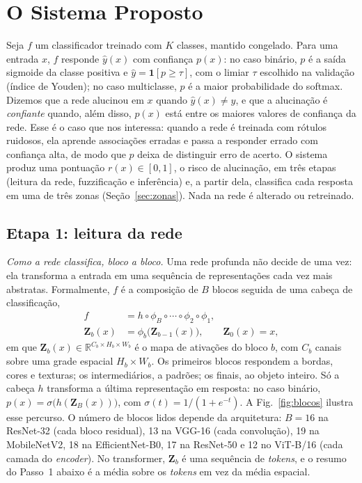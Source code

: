 \section{O Sistema Proposto}

Seja $f$ um classificador treinado com $K$ classes, mantido congelado. Para uma entrada $x$, $f$ responde $\hat y(x)$ com confiança $p(x)$:
no caso binário, $p$ é a saída sigmoide da classe positiva e $\hat y = \mathbf{1}[p \ge \tau]$, com o limiar $\tau$ escolhido na validação
(índice de Youden); no caso multiclasse, $p$ é a maior probabilidade do softmax. Dizemos que a rede alucinou em $x$ quando $\hat y(x) \ne y$, e que a alucinação é \emph{confiante} quando, além disso, $p(x)$ está entre os
maiores valores de confiança da rede. Esse é o caso que nos interessa: quando a rede é treinada com rótulos ruidosos, ela aprende
associações erradas e passa a responder errado com confiança alta, de modo que $p$ deixa de distinguir erro de acerto.
O sistema produz uma pontuação $r(x) \in [0,1]$, o risco de alucinação, em três etapas (leitura da rede, fuzzificação e inferência)
e, a partir dela, classifica cada resposta em uma de três zonas (Seção~\ref{sec:zonas}). Nada na rede é alterado ou retreinado.

\subsection{Etapa 1: leitura da rede}
\label{sec:leitura}

\textit{Como a rede classifica, bloco a bloco.}
Uma rede profunda não decide de uma vez: ela transforma a entrada em uma sequência de representações cada vez mais abstratas. Formalmente,
$f$ é a composição de $B$ blocos seguida de uma cabeça de classificação,
\begin{align}
  f &= h \circ \phi_B \circ \cdots \circ \phi_2 \circ \phi_1, \nonumber\\
  \mathbf{Z}_b(x) &= \phi_b\big(\mathbf{Z}_{b-1}(x)\big), \qquad \mathbf{Z}_0(x) = x,
  \label{eq:blocos}
\end{align}
em que $\mathbf{Z}_b(x) \in \mathbb{R}^{C_b \times H_b \times W_b}$ é o mapa de ativações do bloco $b$, com $C_b$ canais sobre uma grade
espacial $H_b \times W_b$. Os primeiros blocos respondem a bordas, cores e texturas; os intermediários, a padrões; os finais, ao objeto
inteiro. Só a cabeça $h$ transforma a última representação em resposta: no caso binário, $p(x) = \sigma\big(h(\mathbf{Z}_B(x))\big)$, com
$\sigma(t) = 1/(1+e^{-t})$. A Fig.~\ref{fig:blocos} ilustra esse percurso. O número de blocos lidos depende da arquitetura: $B=16$ na ResNet-32 (cada bloco
residual), 13 na VGG-16 (cada convolução), 19 na MobileNetV2, 18 na EfficientNet-B0, 17 na ResNet-50 e 12 no ViT-B/16 (cada camada do
\textit{encoder}). No transformer, $\mathbf{Z}_b$ é uma sequência de \textit{tokens}, e o resumo do Passo~1 abaixo é a média sobre os
\textit{tokens} em vez da média espacial.

